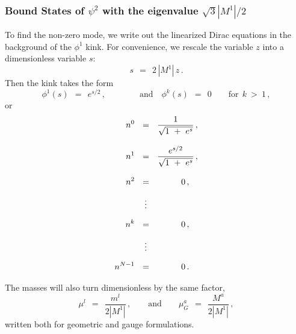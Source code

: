 \documentclass[epsfig,12pt]{article}
\def\beq{\begin{equation}}
\def\eeq{\end{equation}}
\def\beq{\begin{equation}}
\def\eeq{\end{equation}}
\begin{document}
\subsubsection{Bound States of $\psi^2$ with the eigenvalue $\sqrt{3}|M^1|/2$}
\label{bound}



       To find the non-zero mode, we write out the linearized Dirac equations in the background
       of the $ \phi^1 $ kink.
       For convenience, we rescale the variable $ z $ into a dimensionless variable $ s $:
\beq
       s ~~=~~ 2\, |M^1|\, z\,.
\eeq
       Then the kink takes the form
\beq
       \phi^1(s) ~~=~~ e^{s/2}\,,\qquad\qquad\text{and}\quad \phi^k(s) ~~=~~ 0 \qquad \text{for}~~ k ~>~ 1\,,
\eeq
       or
\begin{align}
%
\notag
       n^0  & ~~=~~ \frac {             1              }
                          {    \sqrt{ 1 ~+~ e^s }      }\,, \\[3mm]
%
\notag
       n^1  & ~~=~~ \frac {          e^{s/2}           }
                          {    \sqrt{ 1 ~+~ e^s }      }\,, \\[3mm]
%
\notag
       n^2  & ~~=~~ \qquad~~\, 0\,,  \\[2mm]
%	 
            & ~~~\,\vdots          \\[2mm]
%
\notag
       n^k  & ~~=~~ \qquad~~\, 0\,,  \\[2mm]
%	 
\notag
            & ~~~\,\vdots          \\[2mm]
%
\notag
       n^{N-1} & ~~=~~ \qquad~~\, 0\,.                
\end{align}

       The masses will also turn dimensionless by the same factor,
\beq
       \mu^l  ~~=~~ \frac{ m^l }
                        {2 |M^1|}\,,
	\qquad
	\text{and}
	\qquad
	\mu_G^a ~~=~~ \frac{ M^a }
                          {2 |M^1|}\,,
\eeq
       written both for geometric and gauge formulations.
\end{document}
